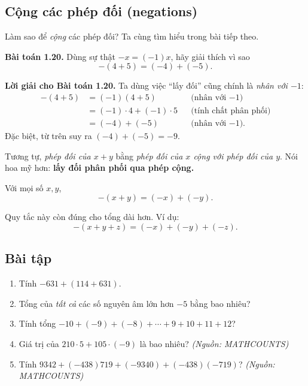 

\subsection*{Cộng các phép đối (negations)}

Làm sao để \emph{cộng} các phép đối? Ta cùng tìm hiểu trong bài tiếp theo.

\textbf{Bài toán 1.20.} Dùng sự thật $-x = (-1)x$, hãy giải thích vì sao
\[
-(4+5)=(-4)+(-5).
\]

\textbf{Lời giải cho Bài toán 1.20.} Ta dùng việc ``lấy đối'' cũng chính là \emph{nhân với $-1$}:
\[
\begin{aligned}
-(4+5) &= (-1)(4+5) && \text{(nhân với $-1$)}\\
&= (-1)\cdot 4 + (-1)\cdot 5 && \text{(tính chất phân phối)}\\
&= (-4) + (-5) && \text{(nhân với $-1$).}
\end{aligned}
\]
Đặc biệt, từ trên suy ra $(-4)+(-5)=-9$.

Tương tự, \emph{phép đối của $x+y$} bằng \emph{phép đối của $x$ cộng với phép đối của $y$}. Nói hoa mỹ hơn: \textbf{lấy đối phân phối qua phép cộng.}

\begin{tcolorbox}[title=\textbf{Quan trọng — Đối của tổng},colback=white,
  colframe=black!20!gray,sharp corners,boxrule=0.4pt]
Với mọi số $x,y$,
\[
-(x+y)=(-x)+(-y).
\]
\end{tcolorbox}

Quy tắc này còn đúng cho tổng dài hơn. Ví dụ:
\[
-(x+y+z)=(-x)+(-y)+(-z).
\]


\subsection*{Bài tập}
\begin{enumerate}[leftmargin=*,label=\textbf{1.4.\arabic*}]
  \item Tính $-631 + (114+631)$.
  \item Tổng của \emph{tất cả} các số nguyên âm lớn hơn $-5$ bằng bao nhiêu?
  \item Tính tổng $-10 + (-9) + (-8) + \cdots + 9 + 10 + 11 + 12$?
  \item Giá trị của $210\cdot 5 + 105\cdot (-9)$ là bao nhiêu? \textit{(Nguồn: MATHCOUNTS)}
  \item Tính $9342 + (-438)719 + (-9340) + (-438)(-719)$? \textit{(Nguồn: MATHCOUNTS)}
\end{enumerate}

